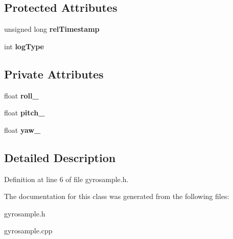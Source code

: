 \subsection*{Protected Attributes}
\begin{DoxyCompactItemize}
\item 
\hypertarget{class_sample_a24ea733ab0a815949a57aca2a4740e33}{unsigned long {\bfseries rel\-Timestamp}}\label{class_sample_a24ea733ab0a815949a57aca2a4740e33}

\item 
\hypertarget{class_sample_a3a6454628c790459f41de5c83bf3ec7c}{int {\bfseries log\-Type}}\label{class_sample_a3a6454628c790459f41de5c83bf3ec7c}

\end{DoxyCompactItemize}
\subsection*{Private Attributes}
\begin{DoxyCompactItemize}
\item 
\hypertarget{class_gyro_sample_a54e5450ba9577976cdaba4f5c2e61422}{float {\bfseries roll\-\_\-}}\label{class_gyro_sample_a54e5450ba9577976cdaba4f5c2e61422}

\item 
\hypertarget{class_gyro_sample_ad2574d31543929b4d54bf64236346bdb}{float {\bfseries pitch\-\_\-}}\label{class_gyro_sample_ad2574d31543929b4d54bf64236346bdb}

\item 
\hypertarget{class_gyro_sample_ae9454e936037dfb739b355e1baed42b5}{float {\bfseries yaw\-\_\-}}\label{class_gyro_sample_ae9454e936037dfb739b355e1baed42b5}

\end{DoxyCompactItemize}


\subsection{Detailed Description}


Definition at line 6 of file gyrosample.\-h.



The documentation for this class was generated from the following files\-:\begin{DoxyCompactItemize}
\item 
gyrosample.\-h\item 
gyrosample.\-cpp\end{DoxyCompactItemize}

